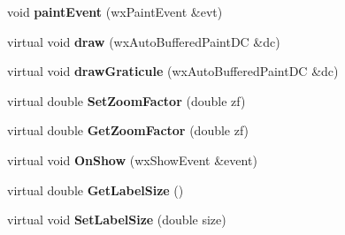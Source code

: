 \begin{DoxyCompactItemize}
\item 
\hypertarget{class_plot_panel_a042c9df2ebe0c245d9fb5f3aa63595bc}{void {\bfseries paint\-Event} (wx\-Paint\-Event \&evt)}\label{class_plot_panel_a042c9df2ebe0c245d9fb5f3aa63595bc}

\item 
\hypertarget{class_plot_panel_a5f35a9628a035ef904fb056f5ebcc3c3}{virtual void {\bfseries draw} (wx\-Auto\-Buffered\-Paint\-D\-C \&dc)}\label{class_plot_panel_a5f35a9628a035ef904fb056f5ebcc3c3}

\item 
\hypertarget{class_plot_panel_ac9a8cc0d4ab016dc22195b813643c675}{virtual void {\bfseries draw\-Graticule} (wx\-Auto\-Buffered\-Paint\-D\-C \&dc)}\label{class_plot_panel_ac9a8cc0d4ab016dc22195b813643c675}

\item 
\hypertarget{class_plot_panel_a8e8722d1f4c02f166f7acd6905ea4009}{virtual double {\bfseries Set\-Zoom\-Factor} (double zf)}\label{class_plot_panel_a8e8722d1f4c02f166f7acd6905ea4009}

\item 
\hypertarget{class_plot_panel_a6f6ef3db5a4b4f6cb50d92a38fa36dbd}{virtual double {\bfseries Get\-Zoom\-Factor} (double zf)}\label{class_plot_panel_a6f6ef3db5a4b4f6cb50d92a38fa36dbd}

\item 
\hypertarget{class_plot_panel_a3858e2d6bd9f1cfc900c5a1c7391e0fb}{virtual void {\bfseries On\-Show} (wx\-Show\-Event \&event)}\label{class_plot_panel_a3858e2d6bd9f1cfc900c5a1c7391e0fb}

\item 
\hypertarget{class_plot_panel_a539ab140f79c5cff29031aa312a9f159}{virtual double {\bfseries Get\-Label\-Size} ()}\label{class_plot_panel_a539ab140f79c5cff29031aa312a9f159}

\item 
\hypertarget{class_plot_panel_a2fcb6c7fc21c942122b0a8f4d4a9af2d}{virtual void {\bfseries Set\-Label\-Size} (double size)}\label{class_plot_panel_a2fcb6c7fc21c942122b0a8f4d4a9af2d}

\end{DoxyCompactItemize}
